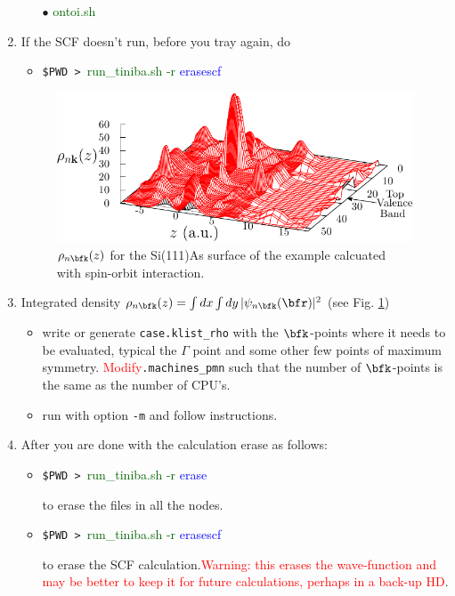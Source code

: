 \documentclass[12pt,leqno]{article}
\numberwithin{equation}{section}
\begin{document}
\begin{enumerate}
\begin{itemize}
$\bullet$ \textcolor{darkgreen}{ontoi.sh}

\end{itemize}

\item If the SCF doesn't run, before you tray again, do
\begin{itemize}
\item\verb=$PWD > =\textcolor{darkgreen}{run\_tiniba.sh -r} \textcolor{blue}{erasescf}
\end{itemize}

\begin{figure}[t]
\begin{center}
\includegraphics[scale=1.0]{plots/3drho}
\end{center}
\caption{$\rho_{n\bfk}(z)$ for the Si(111)As surface of the example
  calcuated with spin-orbit interaction.
}
\label{figrho}
\end{figure}

\item Integrated density  $\rho_{n\bfk}(z)=\int dx\int  dy\,|\psi_{n\bfk}(\bfr)|^2$ (see Fig. \ref{figrho})

\begin{itemize}
\item
 write or generate \verb=case.klist_rho= with the
 $\bfk$-points where it
needs to be evaluated, typical the $\Gamma$ point and some other few
points of maximum
symmetry. \textcolor{red}{Modify}\verb=.machines_pmn= such that the
number of $\bfk$-points is the same as the number of CPU's.
\item run with option \verb=-m= and follow instructions.
\end{itemize}
\item After you are done with the calculation erase as follows:
\begin{itemize}
\item\verb=$PWD > =\textcolor{darkgreen}{run\_tiniba.sh -r} \textcolor{blue}{erase}

to erase the files in all the nodes.

\item\verb=$PWD > =\textcolor{darkgreen}{run\_tiniba.sh -r} \textcolor{blue}{erasescf}

to erase the SCF calculation.\textcolor{red}{Warning: this erases the wave-function and may
 be better to keep it for future calculations, perhaps in a back-up HD}.

\end{itemize}

\end{enumerate}
\end{document}
